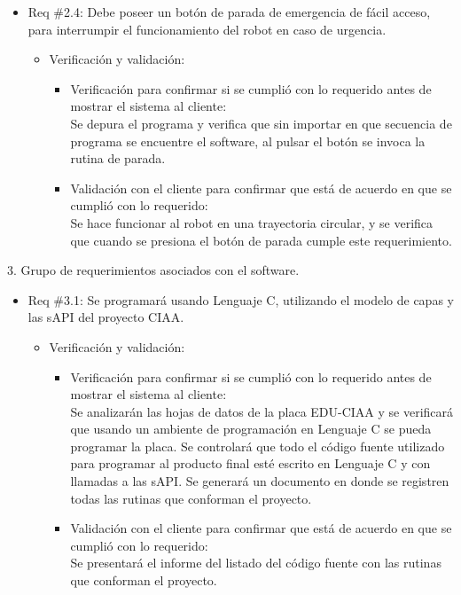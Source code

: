 \documentclass[11pt]{charter}
\begin{document}
\begin{itemize}
\item Req \#2.4: Debe poseer un botón de parada de emergencia de fácil acceso, para interrumpir el funcionamiento del robot en caso de urgencia.
\begin{itemize}
\item Verificación y validación:
	\begin{itemize}
	\item Verificación para confirmar si se cumplió con lo requerido 	antes de mostrar el sistema al cliente:\\
	Se depura el programa  y verifica que sin importar en que
	secuencia de programa se encuentre el software, al pulsar el
	botón se invoca la rutina de parada.  
	\item Validación con el cliente para confirmar que está de 				acuerdo en que se cumplió con lo requerido:\\
	Se hace funcionar al robot en una  trayectoria circular, y se
	verifica que cuando se presiona el botón de parada cumple este
	requerimiento.  
	\end{itemize}
\end{itemize}
\end{itemize}

3. Grupo de requerimientos asociados con el software.

\begin{itemize}
\item Req \#3.1: Se programará usando Lenguaje C, utilizando el modelo de capas y las sAPI del proyecto CIAA.
\begin{itemize}
\item Verificación y validación:
	\begin{itemize}
	\item Verificación para confirmar si se cumplió con lo requerido 	antes de mostrar el sistema al cliente:\\
	Se analizarán las hojas de datos de la placa EDU-CIAA  y se
	verificará que usando un ambiente de programación en Lenguaje C
	se pueda programar la placa. Se controlará que todo el código
	fuente utilizado para programar al producto final esté escrito
	en Lenguaje C y con llamadas a las sAPI.
	Se generará un documento en donde se registren todas las rutinas
	que conforman el proyecto. 
	\item Validación con el cliente para confirmar que está de 				acuerdo en que se cumplió con lo requerido:\\
	Se presentará el informe del listado del código fuente con las
	rutinas que conforman el proyecto.   
	\end{itemize}
\end{itemize}
\end{itemize}
\end{document}
